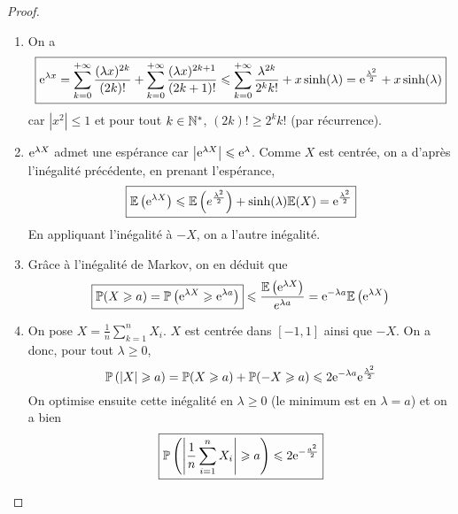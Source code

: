 \documentclass[12pt]{article}
\begin{document}
\begin{proof}
    \phantom{}
    \begin{enumerate}
        \item On a 
        \begin{equation}
            \boxed{\mathrm{e}^{\lambda x}=\sum_{k=0}^{+\infty}\frac{(\lambda x)^{2k}}{(2k)!}+\sum_{k=0}^{+\infty}\frac{(\lambda x)^{2k+1}}{(2k+1)!}\leqslant\sum_{k=0}^{+\infty}\frac{\lambda^{2k}}{2^{k}k!}+x\sinh(\lambda)=\mathrm{e}^{\frac{\lambda^{2}}{2}}+x\sinh(\lambda)}
        \end{equation}
        car $\left\lvert x^{2}\right\rvert\leqslant1$ et pour tout $k\in\mathbb{N}^{*}$, $(2k)!\geqslant2^{k}k!$ (par récurrence).

        \item $\mathrm{e}^{\lambda X}$ admet une espérance car $\left\lvert\mathrm{e}^{\lambda X}\right\rvert\leqslant \mathrm{e}^{\lambda}$. Comme $X$ est centrée, on a d'après l'inégalité précédente, en prenant l'espérance,
        \begin{equation}
            \boxed{\mathbb{E}\left(\mathrm{e}^{\lambda X}\right)\leqslant\mathbb{E}\left(e^{\frac{\lambda^{2}}{2}}\right)+\sinh(\lambda)\mathbb{E}(X)=\mathrm{e}^{\frac{\lambda^{2}}{2}}}
        \end{equation}
        En appliquant l'inégalité à $-X$, on a l'autre inégalité.

        \item Grâce à l'inégalité de Markov, on en déduit que 
        \begin{equation}
            \boxed{\mathbb{P}(X\geqslant a)=\mathbb{P}\left(\mathrm{e}^{\lambda X}\geqslant \mathrm{e}^{\lambda a}\right)}\leqslant \frac{\mathbb{E}\left(\mathrm{e}^{\lambda X}\right)}{e^{\lambda a}}=\mathrm{e}^{-\lambda a}\mathbb{E}\left(\mathrm{e}^{\lambda X}\right)
        \end{equation}

        \item On pose $X=\frac{1}{n}\sum_{k=1}^{n}X_{i}$. $X$ est centrée dans $[-1,1]$ ainsi que $-X$. On a donc, pour tout $\lambda\geqslant0$,
        \begin{equation}
            \mathbb{P}\left(\left\lvert X\right\rvert\geqslant a\right)=\mathbb{P}(X\geqslant a)+\mathbb{P}(-X\geqslant a)\leqslant 2\mathrm{e}^{-\lambda a}\mathrm{e}^{\frac{\lambda^{2}}{2}}
        \end{equation}
        On optimise ensuite cette inégalité en $\lambda\geqslant0$ (le minimum est en $\lambda=a$) et on a bien 
        \begin{equation}
            \boxed{\mathbb{P}\left(\left\lvert\frac{1}{n}\sum_{i=1}^{n}X_{i}\right\rvert\geqslant a\right)\leqslant 2\mathrm{e}^{-\frac{a^{2}}{2}}}
        \end{equation}
    \end{enumerate}
\end{proof}
\end{document}
